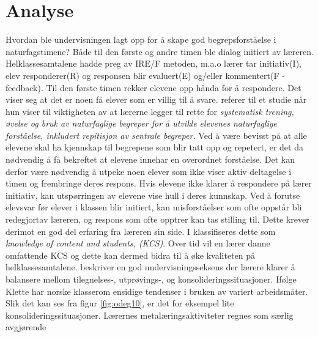 \documentclass[main.tex]{subfiles}
\begin{document}
\section*{Analyse}
\label{sec:2}

Hvordan ble undervisningen lagt opp for å skape god begrepsforståelse i naturfagstimene?
\newline
\newline
Både til den første og andre timen ble dialog initiert av læreren. Helklassesamtalene hadde preg av
IRE/F metoden, m.a.o lærer tar initiativ(I), elev responderer(R) og responsen blir evaluert(E) 
og/eller kommentert(F - feedback). Til den første timen rekker elevene opp hånda for å 
respondere. Det viser seg at det er noen få elever som er villig til å svare. 
\newline
\newline
{} referer til et studie når hun viser til viktigheten av at lærerne 
legger til rette for \emph{systematisk trening, øvelse og bruk av naturfaglige begreper for å utvikle 
elevenes naturfaglige forståelse, inkludert repitisjon av sentrale begreper.}
\newline
\newline
Ved å være bevisst på at alle elevene skal ha kjennskap til 
begrepene som blir tatt opp og repetert, er det da nødvendig å få bekreftet at elevene innehar en 
overordnet forståelse. Det kan derfor være nødvendig å utpeke noen elever som ikke viser aktiv 
deltagelse i timen og frembringe deres respons. Hvis elevene ikke klarer å respondere på lærer 
initiativ, kan utspørringen av elevene vise hull i deres kunnskap. Ved å forutse elevsvar før elever 
i klassen blir initiert, kan misforståelser som ofte oppstår bli redegjortav læreren, og respons som 
ofte opptrer kan tas stilling til. Dette krever derimot en god del erfaring fra læreren sin side. I 
 klassifiseres dette som \emph{knowledge of content and students, (KCS)}.
Over tid vil en lærer danne omfattende KCS og dette kan dermed bidra til å øke kvaliteten på
helklassesamtalene.
\newline
\newline
{} beskriver en god undervisningsseksens der lærere klarer å balansere mellom 
tilegnelses-, utprøvings-, og konsolideringssituasjoner. Ifølge Klette har norske klasserom ensidige 
tendenser i bruken av variert arbeidsmåter. Slik det kan ses fra figur \ref{fig:odeg10}, er det for 
eksempel lite konsolideringssituasjoner. Lærernes metalæringsaktiviteter regnes som særlig avgjørende 
\end{document}
